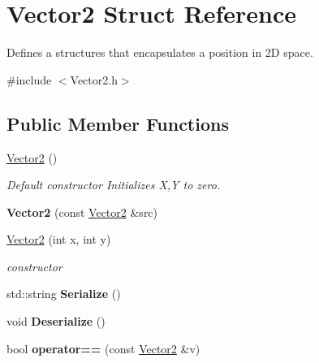 \hypertarget{structVector2}{\section{Vector2 Struct Reference}
\label{structVector2}
}


Defines a structures that encapsulates a position in 2\-D space.  




{\ttfamily \#include $<$Vector2.\-h$>$}

\subsection*{Public Member Functions}
\begin{DoxyCompactItemize}
\item 
\hypertarget{structVector2_a22104d1809be26a419ef1f959e3761bf}{\hyperlink{structVector2_a22104d1809be26a419ef1f959e3761bf}{Vector2} ()}\label{structVector2_a22104d1809be26a419ef1f959e3761bf}

\begin{DoxyCompactList}\small\item\em Default constructor Initializes X,Y to zero. \end{DoxyCompactList}\item 
\hypertarget{structVector2_a5292d22e63825ec0e90e1574825c9570}{{\bfseries Vector2} (const \hyperlink{structVector2}{Vector2} \&src)}\label{structVector2_a5292d22e63825ec0e90e1574825c9570}

\item 
\hyperlink{structVector2_a321cf468f0b0caa050fc802f29af48ee}{Vector2} (int x, int y)
\begin{DoxyCompactList}\small\item\em constructor \end{DoxyCompactList}\item 
\hypertarget{structVector2_a89acd25f33fbf1774fdf960e259cf170}{std\-::string {\bfseries Serialize} ()}\label{structVector2_a89acd25f33fbf1774fdf960e259cf170}

\item 
\hypertarget{structVector2_acc5476ed3ba51ab7ab9b6d49a89e8379}{void {\bfseries Deserialize} ()}\label{structVector2_acc5476ed3ba51ab7ab9b6d49a89e8379}

\item 
\hypertarget{structVector2_af6ee11c85864fe0161ec0e1f477ce882}{bool {\bfseries operator==} (const \hyperlink{structVector2}{Vector2} \&v)}\label{structVector2_af6ee11c85864fe0161ec0e1f477ce882}

\end{DoxyCompactItemize}
